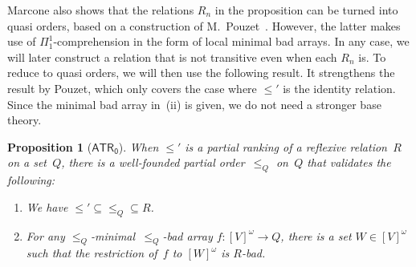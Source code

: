 \documentclass{amsart}
\numberwithin{theorem}{section}
\newtheorem{proposition}[theorem]{Proposition}
\theoremstyle{definition}
\begin{document}
Marcone also shows that the relations $R_n$ in the proposition can be turned into quasi orders, based on a construction of M.~Pouzet~\cite{pouzet-better-relation}. However, the latter makes use of $\Pi^1_1$-comprehension in the form of local minimal bad arrays. In any case, we will later construct a relation that is not transitive even when each $R_n$ is. To reduce to quasi orders, we will then use the following result. It strengthens the result by Pouzet, which only covers the case where $\leq'$ is the identity relation. Since the minimal bad array in~(ii) is given, we do not need a stronger base theory. 

\begin{proposition}[$\mathsf{ATR_0}$]\label{prop:pouzet}
When $\leq'$ is a partial ranking of a reflexive relation~$R$ on a set~$Q$, there is a well-founded partial order~$\leq_Q$ on~$Q$ that validates the following:
\begin{enumerate}[label=(\roman*)]
\item We have ${\leq'}\subseteq{\leq_Q}\subseteq R$.
\item For any $\leq_Q$-minimal~$\leq_Q$-bad array $f:[V]^\omega\to Q$, there is a set $W\in[V]^\omega$ such that the restriction of~$f$ to $[W]^\omega$ is $R$-bad.
\end{enumerate}
\end{proposition}
\end{document}
